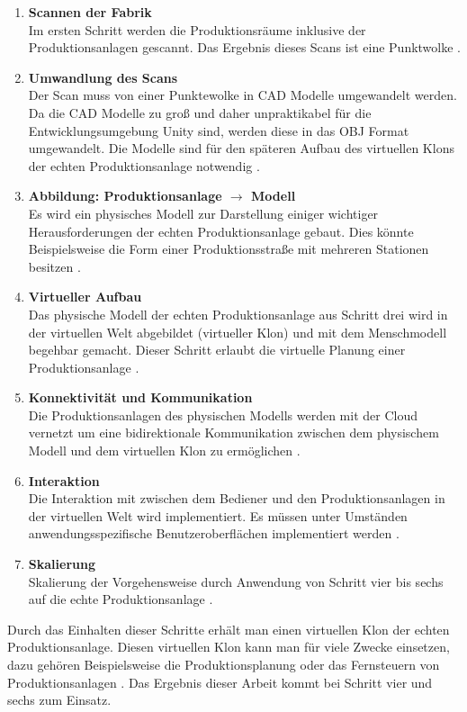 \begin{enumerate}
	\item \textbf{Scannen der Fabrik} \\
	Im ersten Schritt werden die Produktionsräume inklusive der Produktionsanlagen gescannt. Das Ergebnis dieses Scans ist eine Punktwolke \cite{34}.
	\item \textbf{Umwandlung des Scans} \\
	Der Scan muss von einer Punktewolke in CAD Modelle umgewandelt werden. Da die CAD Modelle zu groß und daher unpraktikabel für die Entwicklungsumgebung Unity sind, werden diese in das OBJ Format umgewandelt. Die Modelle sind für den späteren Aufbau des virtuellen Klons der echten Produktionsanlage notwendig \cite{34}.
	\item \textbf{Abbildung: Produktionsanlage $\rightarrow$ Modell} \\
	Es wird ein physisches Modell zur Darstellung einiger wichtiger Herausforderungen der echten Produktionsanlage gebaut. Dies könnte Beispielsweise die Form einer Produktionsstraße mit mehreren Stationen besitzen \cite{34}.
	\item \textbf{Virtueller Aufbau} \\
	Das physische Modell der echten Produktionsanlage aus Schritt drei wird in der virtuellen Welt abgebildet (virtueller Klon) und mit dem Menschmodell begehbar gemacht. Dieser Schritt erlaubt die virtuelle Planung einer Produktionsanlage \cite{34}.
	\item \textbf{Konnektivität und Kommunikation} \\
	Die Produktionsanlagen des physischen Modells werden mit der Cloud vernetzt um eine bidirektionale Kommunikation zwischen dem physischem Modell und dem virtuellen Klon zu ermöglichen \cite{34}.
	\item \textbf{Interaktion} \\
	Die Interaktion mit zwischen dem Bediener und den Produktionsanlagen in der virtuellen Welt wird implementiert. Es müssen unter Umständen anwendungsspezifische Benutzeroberflächen implementiert werden \cite{34}.
	\item \textbf{Skalierung} \\
	Skalierung der Vorgehensweise durch Anwendung von Schritt vier bis sechs auf die echte Produktionsanlage \cite{34}.
\end{enumerate}
Durch das Einhalten dieser Schritte erhält man einen virtuellen Klon der echten Produktionsanlage. Diesen virtuellen Klon kann man für viele Zwecke einsetzen, dazu gehören Beispielsweise die Produktionsplanung oder das Fernsteuern von Produktionsanlagen \cite{34}. Das Ergebnis dieser Arbeit kommt bei Schritt vier und sechs zum Einsatz.

